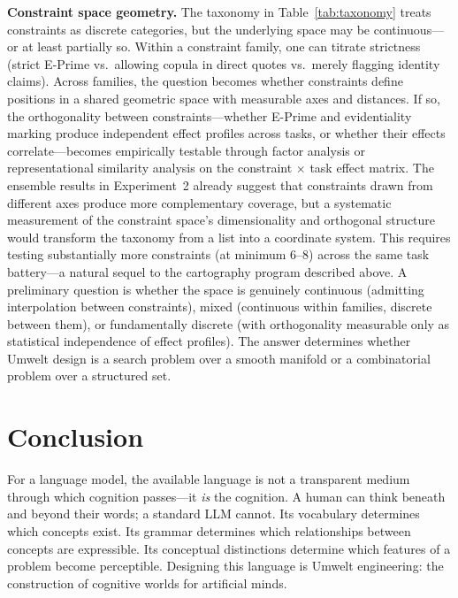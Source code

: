 \documentclass[11pt,a4paper]{article}
\begin{document}
\textbf{Constraint space geometry.} The taxonomy in Table~\ref{tab:taxonomy} treats constraints as discrete categories, but the underlying space may be continuous---or at least partially so. Within a constraint family, one can titrate strictness (strict E-Prime vs.\ allowing copula in direct quotes vs.\ merely flagging identity claims). Across families, the question becomes whether constraints define positions in a shared geometric space with measurable axes and distances. If so, the orthogonality between constraints---whether E-Prime and evidentiality marking produce independent effect profiles across tasks, or whether their effects correlate---becomes empirically testable through factor analysis or representational similarity analysis on the constraint $\times$ task effect matrix. The ensemble results in Experiment~2 already suggest that constraints drawn from different axes produce more complementary coverage, but a systematic measurement of the constraint space's dimensionality and orthogonal structure would transform the taxonomy from a list into a coordinate system. This requires testing substantially more constraints (at minimum 6--8) across the same task battery---a natural sequel to the cartography program described above. A preliminary question is whether the space is genuinely continuous (admitting interpolation between constraints), mixed (continuous within families, discrete between them), or fundamentally discrete (with orthogonality measurable only as statistical independence of effect profiles). The answer determines whether Umwelt design is a search problem over a smooth manifold or a combinatorial problem over a structured set.

\section{Conclusion}

For a language model, the available language is not a transparent medium through which cognition passes---it \emph{is} the cognition. A human can think beneath and beyond their words; a standard LLM cannot. Its vocabulary determines which concepts exist. Its grammar determines which relationships between concepts are expressible. Its conceptual distinctions determine which features of a problem become perceptible. Designing this language is Umwelt engineering: the construction of cognitive worlds for artificial minds.
\end{document}

